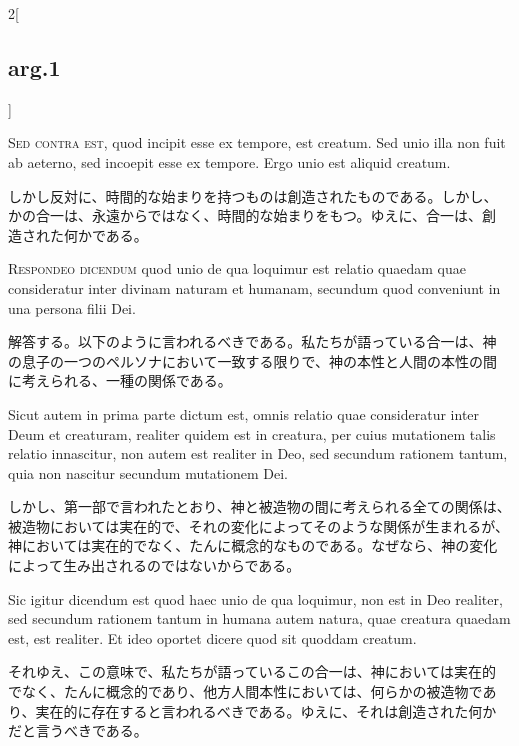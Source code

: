 \documentclass[paper=a4paper,fontsize=10pt,jafontsize=9pt,titlepage]{jlreq}
\begin{document}
\begin{paracol}{2}[\subsection{arg.1}]
\switchcolumn*[\subsection{s.c.}]

{\scshape Sed contra est}, quod incipit esse ex tempore, est
creatum. Sed unio illa non fuit ab aeterno, sed incoepit esse ex
tempore. Ergo unio est aliquid creatum.

\switchcolumn

しかし反対に、時間的な始まりを持つものは創造されたものである。しかし、
かの合一は、永遠からではなく、時間的な始まりをもつ。ゆえに、合一は、創
造された何かである。


{\scshape Respondeo dicendum} quod unio de qua loquimur est relatio
quaedam quae consideratur inter divinam naturam et humanam, secundum
quod conveniunt in una persona filii Dei.

\switchcolumn

解答する。以下のように言われるべきである。私たちが語っている合一は、神
の息子の一つのペルソナにおいて一致する限りで、神の本性と人間の本性の間
に考えられる、一種の関係である。

\switchcolumn*

Sicut autem in prima parte dictum est, omnis relatio quae consideratur
inter Deum et creaturam, realiter quidem est in creatura, per cuius
mutationem talis relatio innascitur, non autem est realiter in Deo,
sed secundum rationem tantum, quia non nascitur secundum mutationem
Dei.

\switchcolumn

しかし、第一部で言われたとおり、神と被造物の間に考えられる全ての関係は、
被造物においては実在的で、それの変化によってそのような関係が生まれるが、
神においては実在的でなく、たんに概念的なものである。なぜなら、神の変化
によって生み出されるのではないからである。

\switchcolumn*

Sic igitur dicendum est quod haec unio de qua loquimur, non est in Deo
realiter, sed secundum rationem tantum in humana autem natura, quae
creatura quaedam est, est realiter. Et ideo oportet dicere quod sit
quoddam creatum.

\switchcolumn

それゆえ、この意味で、私たちが語っているこの合一は、神においては実在的
でなく、たんに概念的であり、他方人間本性においては、何らかの被造物であ
り、実在的に存在すると言われるべきである。ゆえに、それは創造された何か
だと言うべきである。


\end{paracol}
\end{document}
